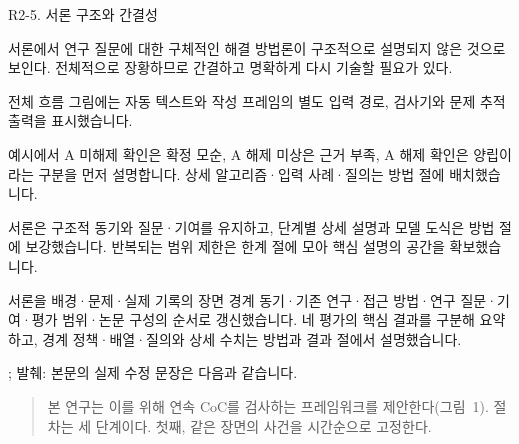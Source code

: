 \begin{reviewitem}{R2-5. 서론 구조와 간결성}

\begin{reviewercomment}

서론에서 연구 질문에 대한 구체적인 해결 방법론이 구조적으로 설명되지 않은 것으로 보인다. 전체적으로 장황하므로 간결하고 명확하게 다시 기술할 필요가 있다.

\end{reviewercomment}

\begin{authorresponse}

전체 흐름 그림에는 자동 텍스트와 작성 프레임의 별도 입력 경로, 검사기와 문제 추적 출력을 표시했습니다.

예시에서 A 미해제 확인은 확정 모순, A 해제 미상은 근거 부족, A 해제 확인은 양립이라는 구분을 먼저 설명합니다. 상세 알고리즘·입력 사례·질의는 방법 절에 배치했습니다.

서론은 구조적 동기와 질문·기여를 유지하고, 단계별 상세 설명과 모델 도식은 방법 절에 보강했습니다. 반복되는 범위 제한은 한계 절에 모아 핵심 설명의 공간을 확보했습니다.

서론을 배경·문제·실제 기록의 장면 경계 동기·기존 연구·접근 방법·연구 질문·기여·평가 범위·논문 구성의 순서로 갱신했습니다. 네 평가의 핵심 결과를 구분해 요약하고, 경계 정책·배열·질의와 상세 수치는 방법과 결과 절에서 설명했습니다.

\end{authorresponse}

\begin{manuscriptrevision}{; 발췌: }
본문의 실제 수정 문장은 다음과 같습니다.

\begin{quote}
본 연구는 이를 위해 연속 CoC를 검사하는 프레임워크를 제안한다(그림~1). 절차는 세 단계이다. 첫째, 같은 장면의 사건을 시간순으로 고정한다.
\end{quote}
\end{manuscriptrevision}

\end{reviewitem}

\clearpage


